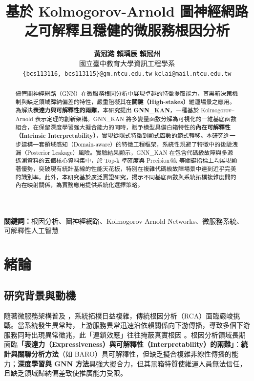 \documentclass[10pt,a4paper,twocolumn]{article}
\title{基於 Kolmogorov-Arnold 圖神經網路之可解釋且穩健的微服務根因分析}
\author{
    \textbf{黃冠澔} \quad \textbf{賴瑀辰} \quad \textbf{賴冠州} \\[0.5em]
    國立臺中教育大學資訊工程學系 \\[0.3em]
    \texttt{\{bcs113116, bcs113115\}@gm.ntcu.edu.tw} \quad \texttt{kclai@mail.ntcu.edu.tw}
}
\date{}
\begin{document}
\maketitle

\begin{abstract}
\noindent
儘管圖神經網路（GNN）在微服務根因分析中展現卓越的特徵提取能力，其黑箱決策機制與缺乏領域歸納偏差的特性，嚴重阻礙其在\textbf{關鍵（High-stakes）}維運場景之應用。為解決\textbf{表達力與可解釋性的兩難}，本研究提出 \textbf{GNN\_KAN}，一種基於 Kolmogorov–Arnold 表示定理的創新架構。GNN\_KAN 將多變量函數分解為可視化的一維基底函數組合，在保留深度學習強大擬合能力的同時，賦予模型具備白箱特性的\textbf{內在可解釋性（Intrinsic Interpretability）}，實現從隱式特徵到顯式函數的範式轉移。本研究進一步建構一套領域感知（Domain-aware）的特徵工程框架，系統性規避了特徵中的後驗洩漏（Posterior Leakage）風險。實驗結果顯示，GNN\_KAN 在包含代碼級故障與多源遙測資料的五個核心資料集中，於 Top-k 準確度與 Precision@k 等關鍵指標上均展現顯著優勢，突破現有統計基線的性能天花板，特別在複雜代碼級故障場景中達到近乎完美的識別率。此外，本研究基於廣泛實證研究，揭示不同基底函數與系統拓樸複雜度間的內在映射關係，為實務應用提供系統化選擇策略。
\end{abstract}

\noindent\textbf{關鍵詞：}根因分析、圖神經網路、Kolmogorov-Arnold Networks、微服務系統、可解釋性人工智慧

\vspace{0.5em}

\section{緒論}

\subsection{研究背景與動機}

隨著微服務架構普及 \cite{microservices_survey}，系統拓樸日益複雜，傳統根因分析（RCA）面臨嚴峻挑戰。當系統發生異常時，上游服務異常迅速沿依賴關係向下游傳播，導致多個下游服務同時出現異常徵兆，此「連鎖效應」往往掩蔽真實根因 \cite{train_ticket}。根因分析領域長期面臨\textbf{「表達力（Expressiveness）與可解釋性（Interpretability）的兩難」}：\textbf{統計與關聯分析方法}（如 BARO）具可解釋性，但缺乏擬合複雜非線性傳播的能力；\textbf{深度學習與 GNN 方法}具強大擬合力，但其黑箱特質使維運人員無法信任，且缺乏領域歸納偏差致使推廣能力受限。
\end{document}
